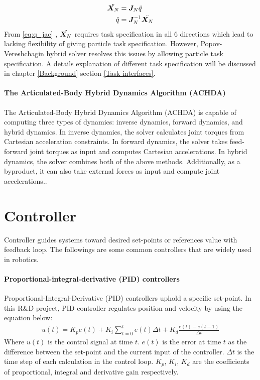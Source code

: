 \documentclass[report.tex]{subfiles}
\begin{document}
    \begin{align}
        \ddot{\bm{X_}N} &= \bm{J}_N \ddot{q}\\
        \label{eq:q_jac} \ddot{q} &= \bm{J}_N^{-1} \ddot{\bm{X_}N}
    \end{align}
    From \ref{eq:q_jac} , $\ddot{\bm{X_}N}$ requires task specification in all 6 directions which lead to lacking flexibility of giving particle task specification. However,  Popov-Vereshchagin hybrid solver resolves this issues by allowing particle task specification. A details explanation of different task specification will be discussed in chapter \ref{Background} section \ref{Task interfaces}.
    \raggedbottom
    \paragraph*{\large{The Articulated-Body Hybrid Dynamics Algorithm (ACHDA)}\\}
    The Articulated-Body Hybrid Dynamics Algorithm (ACHDA) is capable of computing three types of dynamics: inverse dynamics, forward dynamics, and hybrid dynamics. In inverse dynamics, the solver calculates joint torques from Cartesian acceleration constraints. In forward dynamics, the solver takes feed-forward joint torques as input and computes Cartesian accelerations. In hybrid dynamics, the solver combines both of the above methods. Additionally, as a byproduct, it can also take external forces as input and compute joint accelerations.\cite{featherstone2007book}.

    \section{Controller}
    \label{Controller}
    Controller guides systems toward desired set-points or references value with feedback loop. The followings are some common controllers that are widely used in robotics.
    \paragraph*{\large{Proportional-integral-derivative (PID) controllers}\\}
    Proportional-Integral-Derivative (PID) controllers uphold a specific set-point. In this R\&D project, PID controller regulates position and velocity by using the equation below:
    \begin{align}
        u(t) = K_pe(t) + K_i\sum_{t=0}^{t} e(t) \Delta{t} + K_d \frac{e(t)-e(t-1)}{\Delta{t}}
    \end{align}
    Where $u(t)$ is the control signal at time $t$. $e(t)$ is the error at time $t$ as the difference between the set-point and the current input of the controller. $\Delta{t}$ is the time step of each calculation in the control loop. $K_p$, $K_i$, $K_d$ are the coefficients of proportional, integral and derivative gain respectively\cite{johnson2005pid}.
\end{document}
